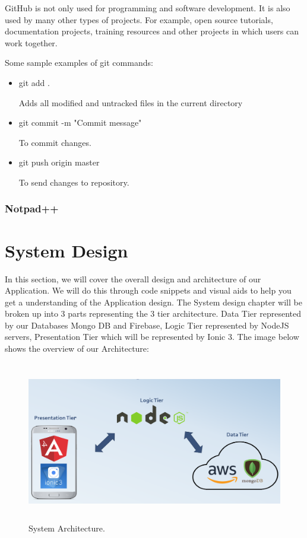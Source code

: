 GitHub is not only used for programming and software development. It is also used by many other types of projects. For example, open source tutorials, documentation projects, training resources and other projects in which users can work together.\cite{GitHub}\par

Some sample examples of git commands:
\begin{itemize}

    \item git add .\par
    Adds all modified and untracked files in the current directory
    
    \item git commit -m "Commit message"\par
    To commit changes.
    
    \item git push origin master\par
    To send changes to repository. 
\end{itemize}

\subsection{Notpad++}

\chapter{System Design}

In this section, we will cover the overall design and architecture of our Application. We will do this through code snippets and visual aids to help you get a understanding of the Application design. The System design chapter will be broken up into 3 parts representing the 3 tier architecture. Data Tier represented by our Databases Mongo DB and Firebase, Logic Tier represented by NodeJS servers, Presentation Tier which will be represented by Ionic 3.
The image below shows the overview of our Architecture:

\begin{figure}[h]
\centering
\includegraphics[width=14cm, height=7cm]{img/Architecture}
\caption{System Architecture.}
\end{figure}

